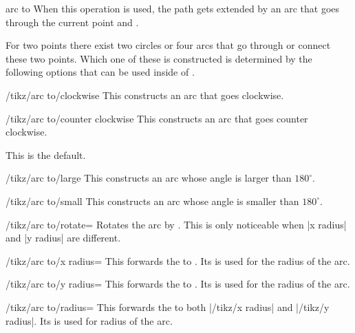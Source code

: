 \begin{pathoperation}{arc to}{}
When this operation is used, the path gets extended by an arc that goes through
the current point and .

For two points there exist two circles or four arcs that go through or connect
these two points. Which one of these is constructed is determined by the following
options that can be used inside of .

\begin{stylekey}{/tikz/arc to/clockwise}
  This constructs an arc that goes clockwise.
\end{stylekey}

\begin{stylekey}{/tikz/arc to/counter clockwise}
  This constructs an arc that goes counter clockwise.
  
  This is the default.
\end{stylekey}

\begin{stylekey}{/tikz/arc to/large}
  This constructs an arc whose angle is larger than $180^\circ$.
\end{stylekey}

\begin{stylekey}{/tikz/arc to/small}
  This constructs an arc whose angle is smaller than $180^\circ$.
\end{stylekey}

\begin{key}{/tikz/arc to/rotate=}
  Rotates the arc by .
  This is only noticeable when |x radius| and |y radius| are different.
\end{key}

\begin{key}{/tikz/arc to/x radius=}
  This forwards the  to .
  Its  is used for the radius of the arc.
\end{key}

\begin{key}{/tikz/arc to/y radius=}
  This forwards the  to .
  Its  is used for the radius of the arc.
\end{key}

\begin{key}{/tikz/arc to/radius=}
  This forwards the  to both |/tikz/x radius| and |/tikz/y radius|.
  Its  is used for radius of the arc.
\end{key}


\end{pathoperation}
